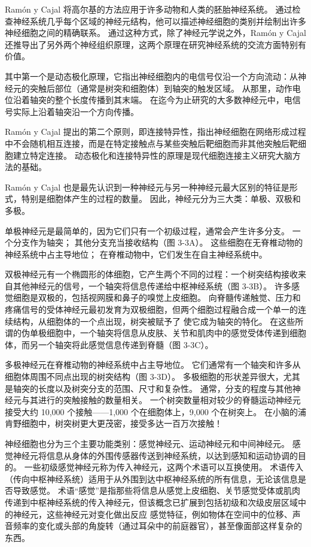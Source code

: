 Ramón y Cajal 将高尔基的方法应用于许多动物和人类的胚胎神经系统。 通过检查神经系统几乎每个区域的神经元结构，他可以描述神经细胞的类别并绘制出许多神经细胞之间的精确联系。 通过这种方式，除了神经元学说之外，Ramón y Cajal 还推导出了另外两个神经组织原理，这两个原理在研究神经系统的交流方面特别有价值。

其中第一个是动态极化原理，它指出神经细胞内的电信号仅沿一个方向流动：从神经元的突触后部位（通常是树突和细胞体）到轴突的触发区域。 从那里，动作电位沿着轴突的整个长度传播到其末端。 在迄今为止研究的大多数神经元中，电信号实际上沿着轴突沿一个方向传播。

Ramón y Cajal 提出的第二个原则，即连接特异性，指出神经细胞在网络形成过程中不会随机相互连接，而是在特定接触点与某些突触后靶细胞而非其他突触后靶细胞建立特定连接。 动态极化和连接特异性的原理是现代细胞连接主义研究大脑方法的基础。

Ramón y Cajal 也是最先认识到一种神经元与另一种神经元最大区别的特征是形式，特别是细胞体产生的过程的数量。 因此，神经元分为三大类：单极、双极和多极。

单极神经元是最简单的，因为它们只有一个初级过程，通常会产生许多分支。 一个分支作为轴突； 其他分支充当接收结构（图 3-3A）。 这些细胞在无脊椎动物的神经系统中占主导地位； 在脊椎动物中，它们发生在自主神经系统中。

双极神经元有一个椭圆形的体细胞，它产生两个不同的过程：一个树突结构接收来自其他神经元的信号，一个轴突将信息传递给中枢神经系统（图 3-3B）。 许多感觉细胞是双极的，包括视网膜和鼻子的嗅觉上皮细胞。 向脊髓传递触觉、压力和疼痛信号的受体神经元最初发育为双极细胞，但两个细胞过程融合成一个单一的连续结构，从细胞体的一个点出现，树突被赋予了 使它成为轴突的特化。 在这些所谓的伪单极细胞中，一个轴突将信息从皮肤、关节和肌肉中的感觉受体传递到细胞体，而另一个轴突将此感觉信息传递到脊髓（图 3-3C）。

多极神经元在脊椎动物的神经系统中占主导地位。 它们通常有一个轴突和许多从细胞体周围不同点出现的树突结构（图 3-3D）。 多极细胞的形状差异很大，尤其是轴突的长度以及树突分支的范围、尺寸和复杂性。 通常，分支的程度与其他神经元与其进行的突触接触的数量相关。 一个树突数量相对较少的脊髓运动神经元接受大约 10,000 个接触——1,000 个在细胞体上，9,000 个在树突上。 在小脑的浦肯野细胞中，树突树更大更茂密，接受多达一百万次接触！

神经细胞也分为三个主要功能类别：感觉神经元、运动神经元和中间神经元。 感觉神经元将信息从身体的外围传感器传送到神经系统，以达到感知和运动协调的目的。 一些初级感觉神经元称为传入神经元，这两个术语可以互换使用。 术语传入（传向中枢神经系统）适用于从外围到达中枢神经系统的所有信息，无论该信息是否导致感觉。 术语“感觉”是指那些将信息从感觉上皮细胞、关节感觉受体或肌肉传递到中枢神经系统的传入神经元，但该概念已扩展到包括初级和次级皮层区域中的神经元，这些神经元对变化做出反应 感觉特征，例如物体在空间中的位移、声音频率的变化或头部的角旋转（通过耳朵中的前庭器官），甚至像面部这样复杂的东西。

